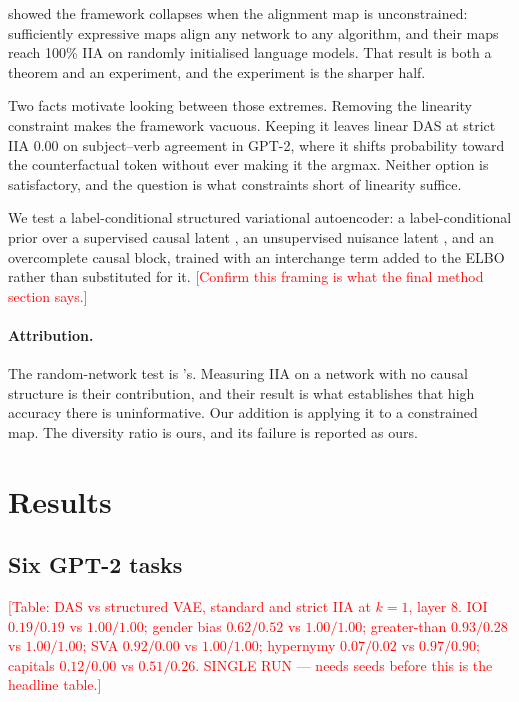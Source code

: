 \documentclass[11pt]{article}
\newcommand{\TODO}[1]{\textcolor{red}{[#1]}}
\begin{document}
\citet{sutter2025nonlinear} showed the framework collapses when the alignment map
is unconstrained: sufficiently expressive maps align any network to any
algorithm, and their maps reach 100\% IIA on randomly initialised language
models. That result is both a theorem and an experiment, and the experiment is the
sharper half.

Two facts motivate looking between those extremes. Removing the linearity
constraint makes the framework vacuous. Keeping it leaves linear DAS at strict
IIA $0.00$ on subject--verb agreement in GPT-2, where it shifts probability toward
the counterfactual token without ever making it the argmax. Neither option is
satisfactory, and the question is what constraints short of linearity suffice.

We test a label-conditional structured variational autoencoder: a
label-conditional prior over a supervised causal latent
\citep{khemakhem2020variational}, an unsupervised nuisance latent
\citep{narayanaswamy2017learning}, and an overcomplete causal block, trained with
an interchange term added to the ELBO rather than substituted for it.
\TODO{Confirm this framing is what the final method section says.}

\paragraph{Attribution.} The random-network test is
\citeauthor{sutter2025nonlinear}'s. Measuring IIA on a network with no causal
structure is their contribution, and their result is what establishes that high
accuracy there is uninformative. Our addition is applying it to a constrained map.
The diversity ratio is ours, and its failure is reported as ours.

\section{Results}

\subsection{Six GPT-2 tasks}

\TODO{Table: DAS vs structured VAE, standard and strict IIA at $k=1$, layer 8.
IOI $0.19/0.19$ vs $1.00/1.00$; gender bias $0.62/0.52$ vs $1.00/1.00$;
greater-than $0.93/0.28$ vs $1.00/1.00$; SVA $0.92/0.00$ vs $1.00/1.00$;
hypernymy $0.07/0.02$ vs $0.97/0.90$; capitals $0.12/0.00$ vs $0.51/0.26$.
SINGLE RUN --- needs seeds before this is the headline table.}
\end{document}
